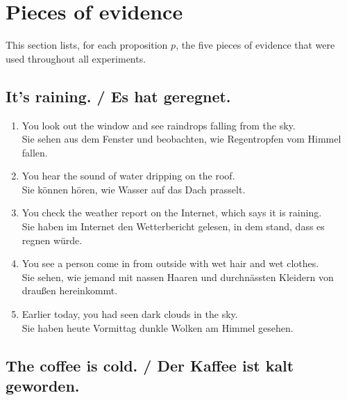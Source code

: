 \documentclass[11pt]{article}
\begin{document}
   



\appendix

\section{Pieces of evidence}
\label{sec:evidence}

This section lists, for each proposition $p$, the five pieces of evidence that were used throughout all experiments.

\subsection{It's raining. / Es hat geregnet.}

\begin{enumerate}
	\item You look out the window and see raindrops falling from the sky. \\ Sie sehen aus dem Fenster und beobachten, wie Regentropfen vom Himmel fallen. 
	\item You hear the sound of water dripping on the roof. \\ Sie können hören, wie Wasser auf das Dach prasselt.
	\item You check the weather report on the Internet, which says it is raining. \\ Sie haben im Internet den Wetterbericht gelesen, in dem stand, dass es regnen würde. 
	\item You see a person come in from outside with wet hair and wet clothes. \\ Sie sehen, wie jemand mit nassen Haaren und durchnässten Kleidern von draußen hereinkommt.
	\item Earlier today, you had seen dark clouds in the sky. \\ Sie haben heute Vormittag dunkle Wolken am Himmel gesehen.
\end{enumerate}

\subsection{The coffee is cold. / Der Kaffee ist kalt geworden.}
\end{document}
